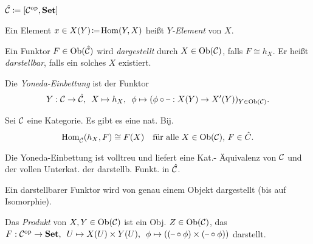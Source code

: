 \documentclass{cheat-sheet}
\begin{document}
\begin{nota}
  $\hat{\mathcal{C}} \coloneqq [\mathcal{C}^{\mathrm{op}}, \mathbf{Set}]$
\end{nota}

\begin{defn}
  Ein Element $x \in X(Y) \!\coloneqq\! \operatorname{Hom}(Y, X)$ heißt \emph{$Y$-Element} von $X$.
\end{defn}

\begin{defn}
  Ein Funktor $F \in \operatorname{Ob}(\hat{\mathcal{C}})$ wird \emph{dargestellt} durch $X \in \operatorname{Ob}(\mathcal{C})$, falls $F \cong h_X$.
  Er heißt \emph{darstellbar}, falls ein solches $X$ existiert.
\end{defn}

\begin{defn}
  Die \emph{Yoneda-Einbettung} ist der Funktor
  \[ Y : \mathcal{C} \to \hat{\mathcal{C}}, \enspace X \mapsto h_X, \enspace \phi \mapsto (\phi \circ \text{--} : X(Y) \to X'(Y))_{Y \in \operatorname{Ob}(\mathcal{C})}. \]
\end{defn}

\begin{lem}
  Sei $\mathcal{C}$ eine Kategorie. Es gibt es eine nat. Bij.
  \[
    \operatorname{Hom}_{\hat{\mathcal{C}}}(h_X, F) \cong F(X) \quad
    \text{für alle $X \in \operatorname{Ob}(\mathcal{C})$, $F \in \hat{C}$.}
  \]
\end{lem}

\begin{kor}
  Die Yoneda-Einbettung ist volltreu und liefert eine Kat.- Äquivalenz von $\mathcal{C}$ und der vollen Unterkat. der darstellb. Funkt. in $\hat{\mathcal{C}}$.
\end{kor}

\begin{kor}
  Ein darstellbarer Funktor wird von genau einem Objekt dargestellt (bis auf Isomorphie).
\end{kor}

\begin{defn}
  Das \emph{Produkt} von $X, Y \in \operatorname{Ob}(\mathcal{C})$ ist ein Obj. $Z \in \operatorname{Ob}(\mathcal{C})$, das
  $F : \mathcal{C}^{\mathrm{op}} \to \mathbf{Set}, \enspace U \mapsto X(U) \times Y(U), \enspace \phi \mapsto ((\text{--} \circ \phi) \times (\text{--} \circ \phi))$ darstellt.
\end{defn}
\end{document}
